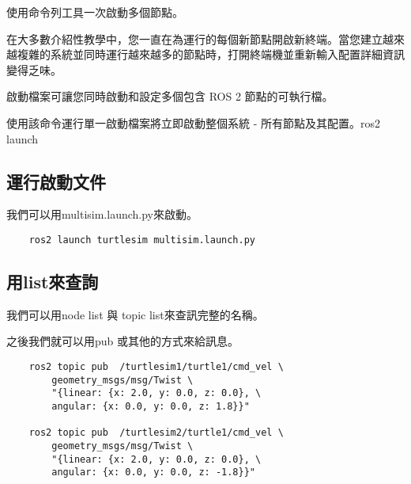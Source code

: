 使用命令列工具一次啟動多個節點。

在大多數介紹性教學中，您一直在為運行的每個新節點開啟新終端。當您建立越來越複雜的系統並同時運行越來越多的節點時，打開終端機並重新輸入配置詳細資訊變得乏味。

啟動檔案可讓您同時啟動和設定多個包含 ROS 2 節點的可執行檔。

使用該命令運行單一啟動檔案將立即啟動整個系統 - 所有節點及其配置。ros2 launch

\subsection{運行啟動文件}
我們可以用multisim.launch.py來啟動。
\begin{verbatim}
    ros2 launch turtlesim multisim.launch.py
\end{verbatim}

\subsection{用list來查詢}

我們可以用node list 與 topic list來查訊完整的名稱。

之後我們就可以用pub 或其他的方式來給訊息。
\begin{verbatim}
    ros2 topic pub  /turtlesim1/turtle1/cmd_vel \ 
        geometry_msgs/msg/Twist \ 
        "{linear: {x: 2.0, y: 0.0, z: 0.0}, \ 
        angular: {x: 0.0, y: 0.0, z: 1.8}}"

    ros2 topic pub  /turtlesim2/turtle1/cmd_vel \ 
        geometry_msgs/msg/Twist \ 
        "{linear: {x: 2.0, y: 0.0, z: 0.0}, \ 
        angular: {x: 0.0, y: 0.0, z: -1.8}}"
\end{verbatim}

